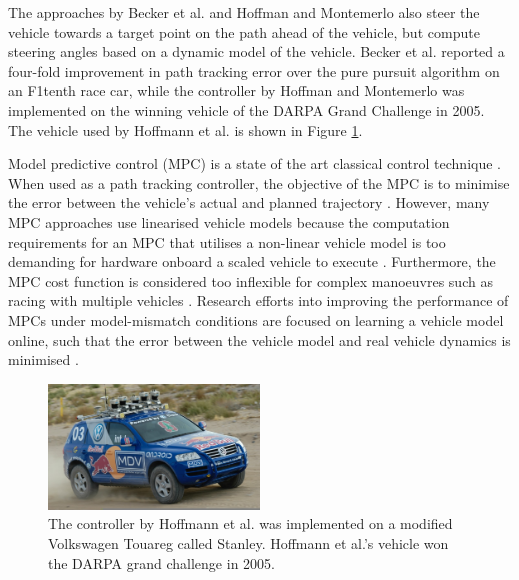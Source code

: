 The approaches by Becker et al. \cite{Becker2022} and Hoffman and Montemerlo \cite{Hoffmann2007} also steer the vehicle towards a target point on the path ahead of the vehicle, but compute steering angles based on a dynamic model of the vehicle.
Becker et al. \cite{Becker2022} reported a four-fold improvement in path tracking error over the pure pursuit algorithm on an F1tenth race car, while the controller by Hoffman and Montemerlo \cite{Hoffmann2007} was implemented on the winning vehicle of the DARPA Grand Challenge in 2005.
The vehicle used by Hoffmann et al.  \cite{Hoffmann2007} is shown in Figure \ref{fig:stanley}.

Model predictive control (MPC) is a state of the art classical control technique \cite{Tatulea-Codrean2020, Beal2013, Achin2021, Williams2016, Liniger2019, Brunner2018a}.
When used as a path tracking controller, the objective of the MPC is to minimise the error between the vehicle's actual and planned trajectory \cite{Liniger2019}.
However, many MPC approaches use linearised vehicle models \cite{Beal2013} because the computation requirements for an MPC that utilises a non-linear vehicle model is too demanding for hardware onboard a scaled vehicle to execute \cite{Tatulea-Codrean2020}.
Furthermore, the MPC cost function is considered too inflexible for complex manoeuvres such as racing with multiple vehicles \cite{Fuchs2021}.
Research efforts into improving the performance of MPCs under model-mismatch conditions are focused on learning a vehicle model online, such that the error between the vehicle model and real vehicle dynamics is minimised \cite{Tatulea-Codrean2020, Brunner2018a}.


\begin{figure}[htb!]
    \centering
    \includegraphics[width=0.5\textwidth]{contents/chapt2/figs/stanley.jpg}
    \caption[The Stanley vehicle]{The controller by Hoffmann et al. \cite{Hoffmann2007} was implemented on a modified Volkswagen Touareg called Stanley. Hoffmann et al.'s vehicle won the DARPA grand challenge in 2005.}
    \label{fig:stanley}
\end{figure}


